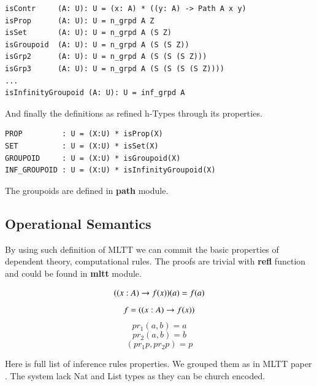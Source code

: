 \documentclass{article}
\begin{document}
\begin{lstlisting}[mathescape=true]
isContr     (A: U): U = (x: A) * ((y: A) -> Path A x y)
isProp      (A: U): U = n_grpd A Z
isSet       (A: U): U = n_grpd A (S Z)
isGroupoid  (A: U): U = n_grpd A (S (S Z))
isGrp2      (A: U): U = n_grpd A (S (S (S Z)))
isGrp3      (A: U): U = n_grpd A (S (S (S (S Z))))
...
isInfinityGroupoid (A: U): U = inf_grpd A
\end{lstlisting}

And finally the definitions as refined h-Types through its properties.

\begin{lstlisting}[mathescape=true]
PROP         : U = (X:U) * isProp(X)
SET          : U = (X:U) * isSet(X)
GROUPOID     : U = (X:U) * isGroupoid(X)
INF_GROUPOID : U = (X:U) * isInfinityGroupoid(X)
\end{lstlisting}

The groupoids are defined in {\bf path} module.

\subsection{Operational Semantics}

By using such definition of MLTT we can commit the basic properties
of dependent theory, computational rules. The proofs are trivial
with {\bf refl} function and could be found in {\bf mltt} module.

\begin{equation} (\\(x:A) \rightarrow f(x))(a) = f(a) \end{equation}
\begin{equation} f = (\\(x:A) \rightarrow f(x)) \end{equation}
\begin{equation} pr_1 (a,b) = a \end{equation}
\begin{equation} pr_2 (a,b) = b \end{equation}
\begin{equation} (pr_1 p,pr_2 p) = p \end{equation}

Here is full list of inference rules properties.
We grouped them as in MLTT paper \cite{Lof84}. The system lack Nat and List
types as they can be church encoded.
\end{document}
